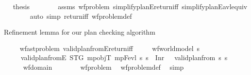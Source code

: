 \begin{isabellebody}
\ \isamarkupfalse%
\ {\isacharquery}{\kern0pt}thesis\isanewline
\ \ \ \ \ \ \isamarkupfalse%
\ assms\ wf{\isacharunderscore}{\kern0pt}problem\ simplify{\isacharunderscore}{\kern0pt}planE{\isacharunderscore}{\kern0pt}return{\isacharunderscore}{\kern0pt}iff\ simplify{\isacharunderscore}{\kern0pt}planE{\isacharunderscore}{\kern0pt}avl{\isacharunderscore}{\kern0pt}equiv\isanewline
\ \ \ \ \ \ \isamarkupfalse%
\ {\isacharparenleft}{\kern0pt}auto\ simp{\isacharcolon}{\kern0pt}\ return{\isacharunderscore}{\kern0pt}iff\ wf{\isacharunderscore}{\kern0pt}problem{\isacharunderscore}{\kern0pt}def{\isacharparenright}{\kern0pt}\isanewline
\ \ \isamarkupfalse%
%
\endisatagproof
{\isafoldproof}%
%
\isadelimproof
%
\endisadelimproof
%
\begin{isamarkuptext}%
Refinement lemma for our plan checking algorithm%
\end{isamarkuptext}\isamarkuptrue%
\ \ \isamarkupfalse%
\ {\isacharparenleft}{\kern0pt}\ wf{\isacharunderscore}{\kern0pt}ast{\isacharunderscore}{\kern0pt}problem{\isacharparenright}{\kern0pt}\ valid{\isacharunderscore}{\kern0pt}plan{\isacharunderscore}{\kern0pt}from{}E{\isacharunderscore}{\kern0pt}return{\isacharunderscore}{\kern0pt}iff{\isacharcolon}{\kern0pt}\isanewline
\ \ \ \ \ {\isachardoublequoteopen}wf{\isacharunderscore}{\kern0pt}world{\isacharunderscore}{\kern0pt}model\ s{\isachardoublequoteclose}\isanewline
\ \ \ \ \ {\isachardoublequoteopen}valid{\isacharunderscore}{\kern0pt}plan{\isacharunderscore}{\kern0pt}from{}E\ STG\ mp{\isacharunderscore}{\kern0pt}objT\ mp{\isacharunderscore}{\kern0pt}Fevl\ s\ {\isasympi}s\ {\isacharequal}{\kern0pt}\ Inr\ {\isacharparenleft}{\kern0pt}{\isacharparenright}{\kern0pt}\ {\isasymlongleftrightarrow}\ valid{\isacharunderscore}{\kern0pt}plan{\isacharunderscore}{\kern0pt}from{}\ s\ {\isasympi}s{\isachardoublequoteclose}\isanewline
%
\isadelimproof
\ \ %
\endisadelimproof
%
\isatagproof
{}\isamarkupfalse%
\ {\isacharminus}{\kern0pt}\isanewline
\ \ \ \ \isamarkupfalse%
\ {\isachardoublequoteopen}wf{\isacharunderscore}{\kern0pt}domain{\isachardoublequoteclose}\isanewline
\ \ \ \ \ \ \isamarkupfalse%
\ wf{\isacharunderscore}{\kern0pt}problem\ \isamarkupfalse%
\ wf{\isacharunderscore}{\kern0pt}problem{\isacharunderscore}{\kern0pt}def\ \isamarkupfalse%
\ simp\isanewline

\end{isabellebody}
